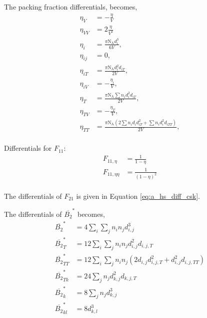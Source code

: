 \documentclass[english]{../thermomemo/thermomemo}
\newcommand*{\lb}{\left(}
\newcommand*{\rb}{\right)}
\newcommand{\hs}{\text{HS}\xspace}
\newcommand{\NA}{\ensuremath{\text{N}_{\text{A}}}\xspace}
\begin{document}
The packing fraction differentials, becomes,
\begin{align}
  \label{eq:eta_diff_2}
  \eta_V &= -\frac{\eta}{V} \\
  \eta_{VV} &= 2\frac{\eta}{V^2} \\
  \eta_i &= \frac{ \pi \NA d_i^3}{6 V},\\
  \eta_{ij} &= 0,\\
  \eta_{iT} &= \frac{ \pi \NA d_i^2 d_{iT}}{2 V},\\
  \eta_{iV} &= -\frac{\eta_i}{V},\\
  \eta_T &= \frac{ \pi \NA \sum n_i d_i^2 d_{iT}}{2 V}, \\
  \eta_{TV} &= -\frac{\eta_T}{V}, \\
  \eta_{TT} &= \frac{ \pi \NA \lb 2 \sum n_i d_i d_{iT}^2 + \sum n_i d_i^2 d_{iTT} \rb}{2 V}, \\
\end{align}

Differentials for $F_{11}$:
\begin{align}
  \label{eq:F11_diff}
    F_{11,\eta}  &= \frac{1}{1-\eta}\\
    F_{11,\eta\eta}  &= \frac{1}{\lb 1-\eta \rb^2}\\
\end{align}

The differentials of $F_{21}$ is given in Equation \ref{eq:a_hs_diff_csk}.

The differentials of $\overline{B_2}^*$ becomes,
\begin{align}
  \label{eq:B2_diff}
  \overline{B_2}^* &= 4\sum_i \sum_j n_{i}n_{j} d_{i,j}^3\\
  \overline{B_2}^*_T &= 12\sum_i \sum_j n_{i}n_{j} d_{i,j}^2d_{i,j,T}\\
  \overline{B_2}^*_{TT} &= 12\sum_i \sum_j n_{i}n_{j} \lb 2d_{i,j}d_{i,j,T}^2 + d_{i,j}^2d_{i,j,TT} \rb\\
  \overline{B_2}^*_{Tk} &= 24\sum_j n_{j} d_{k,j}^2d_{k,j,T}\\
  \overline{B_2}^*_k &= 8 \sum_j n_{j} d_{k,j}^3\\
  \overline{B_2}^*_{kl} &= 8 d_{k,l}^3
\end{align}
\end{document}
